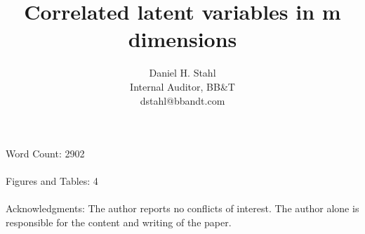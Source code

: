\documentclass[12pt]{article}
\theoremstyle{definition}
\begin{document}


\title{Correlated latent variables in m dimensions}
\date{}
\author{Daniel H. Stahl\\Internal Auditor, BB\&T
        \\dstahl@bbandt.com}

\maketitle
Word Count: 2902
\\
\\
Figures and Tables: 4
\\
\\
Acknowledgments: The author reports no conflicts of interest.  The author alone is responsible for the content and writing of the paper.
\newpage
 
\end{document}
